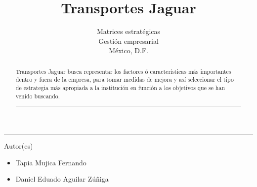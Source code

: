 \title{Transportes Jaguar}
\author{Matrices estratégicas\\
\small Gestión empresarial\\
\small México, D.F.
}

\vspace{2cm}
\maketitle		
	\vspace*{-1cm}
	\begin{center}\rule{0.9\textwidth}{0.1mm}\end{center}
	\begin{abstract}
	\normalsize Transportes Jaguar busca representar los factores ó características más importantes dentro 
	y fuera de la empresa, para tomar medidas de mejora y así  seleccionar el tipo de estrategia más apropiada 
	a la institución en función a los objetivos que se han venido buscando.
	\begin{center}\rule{0.9\textwidth}{0.1mm}\end{center}
	\vspace*{0.5cm}
	\end{abstract}
	\vspace*{9cm}
\small Autor(es)
\begin{itemize}
	\item Tapia Mujica Fernando
	\item  Daniel Eduado Aguilar Zúñiga
\end{itemize}